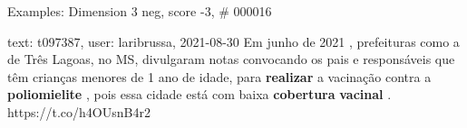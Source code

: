 \begin{frame}{Examples: Dimension 3 neg, score -3, \# 000016}
\footnotesize
\begin{alertblock}{text: t097387, user: laribrussa, 2021-08-30}
Em junho de 2021 , prefeituras como a de Três Lagoas, no MS, divulgaram notas 
convocando os pais e responsáveis que têm crianças menores de 1 ano de idade, 
para \textbf{realizar} a vacinação contra a \textbf{poliomielite} , pois essa 
cidade está com baixa \textbf{cobertura} \textbf{vacinal} . 
https://t.co/h4OUsnB4r2 
\end{alertblock}
\end{frame}
